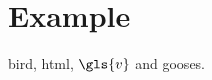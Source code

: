 \documentclass{report}
\begin{document}
\chapter{Example}
\gls{bird}, \gls{html}, $\gls{v}$ and \glspl{goose}.

\printunsrtglossaries
\printindex
\end{document}

